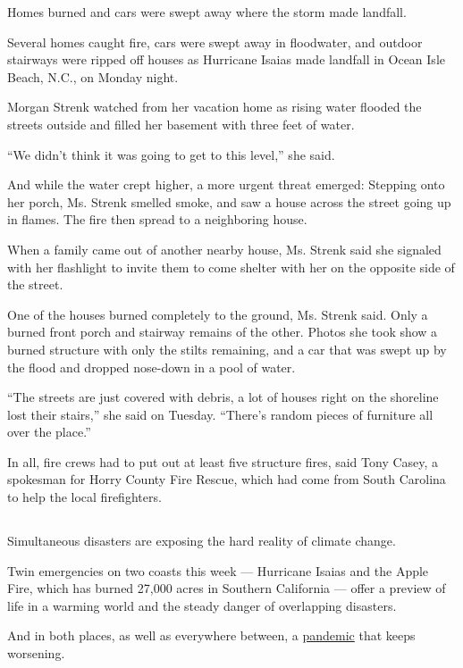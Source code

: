 Homes burned and cars were swept away where the storm made landfall.

Several homes caught fire, cars were swept away in floodwater, and
outdoor stairways were ripped off houses as Hurricane Isaias made
landfall in Ocean Isle Beach, N.C., on Monday night.

Morgan Strenk watched from her vacation home as rising water flooded the
streets outside and filled her basement with three feet of water.

``We didn't think it was going to get to this level,'' she said.

And while the water crept higher, a more urgent threat emerged: Stepping
onto her porch, Ms. Strenk smelled smoke, and saw a house across the
street going up in flames. The fire then spread to a neighboring house.

When a family came out of another nearby house, Ms. Strenk said she
signaled with her flashlight to invite them to come shelter with her on
the opposite side of the street.

One of the houses burned completely to the ground, Ms. Strenk said. Only
a burned front porch and stairway remains of the other. Photos she took
show a burned structure with only the stilts remaining, and a car that
was swept up by the flood and dropped nose-down in a pool of water.

``The streets are just covered with debris, a lot of houses right on the
shoreline lost their stairs,'' she said on Tuesday. ``There's random
pieces of furniture all over the place.''

In all, fire crews had to put out at least five structure fires, said
Tony Casey, a spokesman for Horry County Fire Rescue, which had come
from South Carolina to help the local firefighters.

\hypertarget{-5}{%
\subsection{}\label{-5}}

Simultaneous disasters are exposing the hard reality of climate change.

Twin emergencies on two coasts this week --- Hurricane Isaias and the
Apple Fire, which has burned 27,000 acres in Southern California ---
offer a preview of life in a warming world and the steady danger of
overlapping disasters.

And in both places, as well as everywhere between, a
\href{https://www.nytimes3xbfgragh.onion/interactive/2020/world/coronavirus-maps.html}{pandemic}
that keeps worsening.

